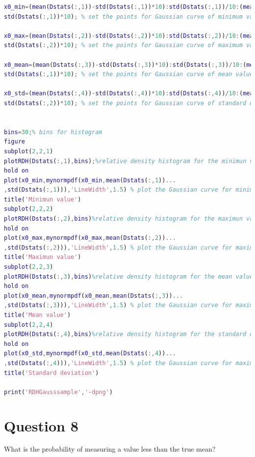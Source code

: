 \documentclass[
	12pt, %
]{fphw}
\begin{document}
\begin{lstlisting}[language=Matlab,escapeinside=``]
x0_min=(mean(Dstats(:,1))-std(Dstats(:,1))*10):std(Dstats(:,1))/10:(mean(Dstats(:,1))+...
std(Dstats(:,1))*10); % set the points for Gaussian curve of minimum value of sample

x0_max=(mean(Dstats(:,2))-std(Dstats(:,2))*10):std(Dstats(:,2))/10:(mean(Dstats(:,2))+...
std(Dstats(:,2))*10); % set the points for Gaussian curve of maximum value of sample

x0_mean=(mean(Dstats(:,3))-std(Dstats(:,3))*10):std(Dstats(:,3))/10:(mean(Dstats(:,3))+...
std(Dstats(:,1))*10); % set the points for Gaussian curve of mean value of sample

x0_std=(mean(Dstats(:,4))-std(Dstats(:,4))*10):std(Dstats(:,4))/10:(mean(Dstats(:,4))+...
std(Dstats(:,2))*10); % set the points for Gaussian curve of standard deviation of sample


bins=30;% bins for histogram
figure
subplot(2,2,1)
plotRDH(Dstats(:,1),bins);%relative density histogram for the minimun value
hold on
plot(x0_min,mynormpdf(x0_min,mean(Dstats(:,1))...
,std(Dstats(:,1))),'LineWidth',1.5) % plot the Gaussian curve for minimum value
title('Minimun value')
subplot(2,2,2)
plotRDH(Dstats(:,2),bins)%relative density histogram for the maximun value
hold on
plot(x0_max,mynormpdf(x0_max,mean(Dstats(:,2))...
,std(Dstats(:,2))),'LineWidth',1.5) % plot the Gaussian curve for maximum value
title('Maximun value')
subplot(2,2,3)
plotRDH(Dstats(:,3),bins)%relative density histogram for the mean value
hold on
plot(x0_mean,mynormpdf(x0_mean,mean(Dstats(:,3))...
,std(Dstats(:,3))),'LineWidth',1.5) % plot the Gaussian curve for maximum value
title('Mean value')
subplot(2,2,4)
plotRDH(Dstats(:,4),bins)%relative density histogram for the standard deviation value
hold on
plot(x0_std,mynormpdf(x0_std,mean(Dstats(:,4))...
,std(Dstats(:,4))),'LineWidth',1.5) % plot the Gaussian curve for maximum value
title('Standard deviation')

print('RDHGausssample','-dpng')

\end{lstlisting}







\section*{Question 8 }

\begin{problem}
What is the probability of measuring a value less than the true mean?
\end{problem}
\end{document}
